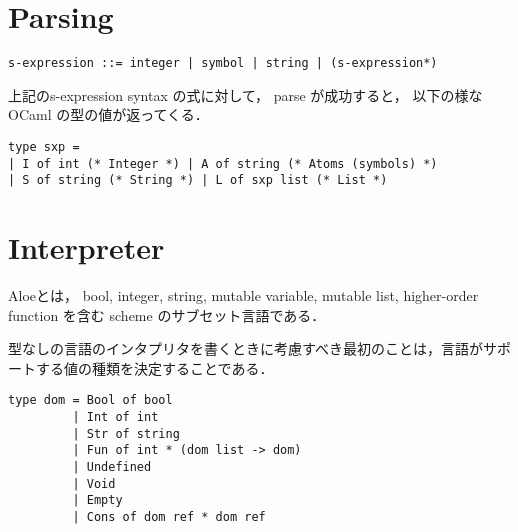 \documentclass[10pt,a4paper]{jarticle}
\theoremstyle{definition}
\begin{document}

\section{Parsing}

{\small
\begin{verbatim}
s-expression ::= integer | symbol | string | (s-expression*)
\end{verbatim}}

上記のs-expression syntax の式に対して， parse が成功すると，
以下の様な OCaml の型の値が返ってくる．

{\small
\begin{verbatim}
type sxp =
| I of int (* Integer *) | A of string (* Atoms (symbols) *)
| S of string (* String *) | L of sxp list (* List *)
\end{verbatim}}

\section{Interpreter}
Aloeとは，
bool, integer, string, mutable variable, mutable list, higher-order function を含む
scheme のサブセット言語である．

型なしの言語のインタプリタを書くときに考慮すべき最初のことは，言語がサポートする値の種類を決定することである．

{\small
\begin{verbatim}
type dom = Bool of bool
         | Int of int
         | Str of string
         | Fun of int * (dom list -> dom)
         | Undefined
         | Void
         | Empty
         | Cons of dom ref * dom ref
\end{verbatim}}
\end{document}
